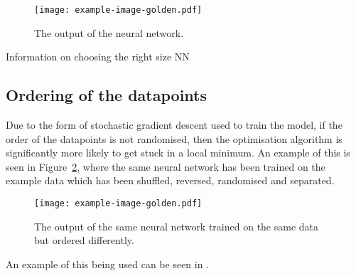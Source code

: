 \begin{figure}[htbp]
	\centering
	\texttt{[image: example-image-golden.pdf]}
	\caption{The output of the neural network.}
	\label{fig:ann-output}
\end{figure}

\begin{todo}
Information on choosing the right size NN
\end{todo}

\subsection{Ordering of the datapoints}

Due to the form of stochastic gradient descent used to train the model, if the order of the datapoints is not randomised, then the optimisation algorithm is significantly more likely to get stuck in a local minimum.
An example of this is seen in Figure~\ref{fig:ann-order}, where the same neural network has been trained on the example data which has been shuffled, reversed, randomised and separated.

\begin{figure}[htbp]
	\centering
	\texttt{[image: example-image-golden.pdf]}
	\caption{The output of the same neural network trained on the same data but ordered differently.}
	\label{fig:ann-order}
\end{figure}

An example of this being used can be seen in \citeauthor{bengio2009}.
